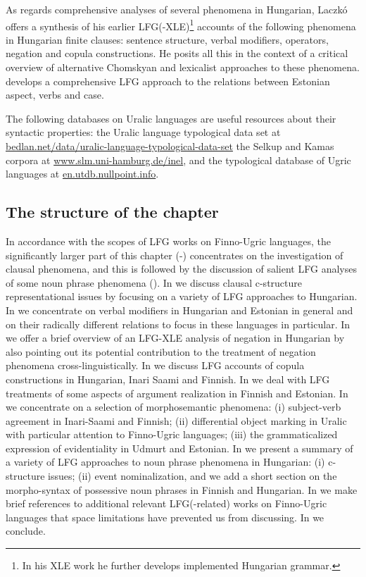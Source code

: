 \documentclass[output=paper,hidelinks]{langscibook}
\begin{document}
As regards comprehensive analyses of several phenomena in Hungarian, Lacz\-kó \citeyear{Laczko2021} offers a synthesis of his earlier LFG(-XLE)\footnote{In his XLE work he further develops  implemented Hungarian grammar.} accounts of the following phenomena in Hungarian finite clauses: sentence structure, verbal modifiers, operators, negation and copula constructions. He posits all this in the context of a critical overview of alternative Chomskyan and lexicalist approaches to these phenomena. \citet{Tamm2004a} develops a comprehensive LFG approach to the relations between Estonian aspect, verbs and case.


The following databases on Uralic languages are useful resources about their syntactic properties:
the Uralic language typological data set at \url{bedlan.net/data/uralic-language-typological-data-set}
the Selkup and Kamas corpora at \url{www.slm.uni-hamburg.de/inel},
and
the typological database of Ugric languages at \url{en.utdb.nullpoint.info}.


\subsection{The structure of the chapter} 
\label{sec:FinnoUgric:1.2}

In accordance with the scopes of LFG works on Finno-Ugric languages, the significantly larger part of this chapter (-) concentrates on the investigation of clausal phenomena, and this is followed by the discussion of salient LFG analyses of some noun phrase phenomena (). In  we discuss clausal c-structure representational issues by focusing on a variety of LFG approaches to Hungarian. In  we concentrate on verbal modifiers in Hungarian and Estonian in general and on their radically different relations to focus in these languages in particular. In  we offer a brief overview of an LFG-XLE analysis of negation in Hungarian by also pointing out its potential contribution to the treatment of negation phenomena cross-linguistically. In  we discuss LFG accounts of copula constructions in Hungarian, Inari Saami and Finnish. In  we deal with LFG treatments of some aspects of argument realization in Finnish and Estonian. In  we concentrate on a selection of morphosemantic phenomena: (i) subject-verb agreement in Inari-Saami and Finnish; (ii) differential object marking in Uralic with particular attention to Finno-Ugric languages; (iii) the grammaticalized expression of evidentiality in Udmurt and Estonian. In  we present a summary of a variety of LFG approaches to noun phrase phenomena in Hungarian: (i) c-structure issues; (ii) event nominalization, and we add a short section on the morpho-syntax of possessive noun phrases in Finnish and Hungarian. In  we make brief references to additional relevant LFG(-related) works on Finno-Ugric languages that space limitations have prevented us from discussing. In  we conclude.
\end{document}
